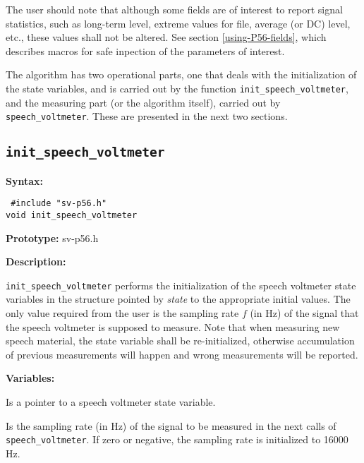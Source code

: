The user should note that although some fields are of interest to report signal
statistics, such as long-term level, extreme values for file, average
(or DC) level, etc., these values shall not be altered. See section 
\ref{using-P56-fields}, which describes macros for safe inpection of 
the parameters of interest.

The algorithm has two operational parts, one that deals with the
initialization of the state variables, and is carried out by the
function {\tt init\_speech\_voltmeter}, and the measuring part (or the
algorithm itself), carried out by {\tt speech\_voltmeter}. These are
presented in the next two sections.


\subsection{{\tt init\_speech\_voltmeter}}

{\bf Syntax: } 

{\tt
\#include "sv-p56.h"\\
void init\_speech\_voltmeter
}

{\bf Prototype: }       sv-p56.h

{\bf Description: }

{\tt init\_speech\_voltmeter} performs the initialization of the
speech voltmeter state variables in the structure pointed by {\em
state} to the appropriate initial values. The only value required from
the user is the sampling rate $f$ (in Hz) of the signal that the speech
voltmeter is supposed to measure. Note that when measuring new
speech material, the state variable shall be re-initialized, otherwise
accumulation of previous measurements will happen and wrong measurements 
will be reported.



{\bf Variables: }
\begin{Descr}{\DescrLen}
\item[\pbox{20mm}{\em state}] %
               Is a pointer to a speech voltmeter state variable. 

\item[\pbox{20mm}{\em f}] %
               Is the sampling rate (in Hz) of the signal to be measured in
               the next calls of {\tt speech\_voltmeter}. If zero or 
               negative, the sampling rate is initialized to 16000 Hz.
\end{Descr}
        
